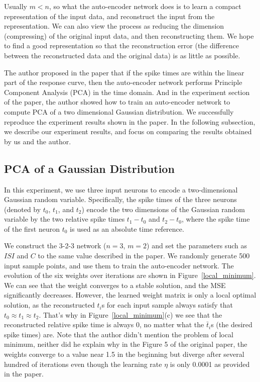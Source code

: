 Usually $m < n$, so what the auto-encoder network does is to learn a compact representation of the input data,
and reconstruct the input from the representation. 
We can also view the process as reducing the dimension (compressing) of the original input data,
and then reconstructing them.
We hope to find a good representation so that the reconstruction error (the difference between the reconstructed
data and the original data) is as little as possible.

The author proposed in the paper that if the spike times are within the linear part of the response curve,
then the auto-encoder network performs Principle Component Analysis (PCA) in the time domain.
And in the experiment section of the paper, the author showed how to train an auto-encoder network to compute PCA
of a two dimensional Gaussian distribution.
We successfully reproduce the experiment results shown in the paper. 
In the following subsection, 
we describe our experiment results, and focus on comparing the results obtained by us and the author.

\subsection{PCA of a Gaussian Distribution}

In this experiment, we use three input neurons to encode a two-dimensional Gaussian random variable.
Specifically, the spike times of the three neurons (denoted by $t_0$, $t_1$, and $t_2$) encode the two 
dimensions of the Gaussian random variable by the two relative spike times $t_1 - t_0$ and $t_2 - t_0$, 
where the spike time of the first neuron $t_0$ is used as an absolute time reference.

We construct the 3-2-3 network ($n=3$, $m=2$) and set the parameters such as $ISI$ and $C$ to the same
value described in the paper.
We randomly generate 500 input sample points, and use them to train the auto-encoder network.
The evolution of the six weights over iterations are shown in Figure~\ref{local_minimum}.
We can see that the weight converges to a stable solution, and the MSE significantly decreases.
However, the learned weight matrix is only a local optimal solution, as the reconstructed $t_i$s for each input sample
always satisfy that $t_0 \approx t_1 \approx t_2$. 
That's why in Figure~\ref{local_minimum}(c) we see that the reconstructed relative spike time is always $0$,
no matter what the $\bar t_i$s (the desired spike times) are.
Note that the author didn't mention the problem of local minimum, 
neither did he explain why in the Figure 5 of the original paper, the weights converge to a value near
1.5 in the beginning but diverge after several hundred of iterations even though the learning rate $\eta$
is only 0.0001 as provided in the paper.


